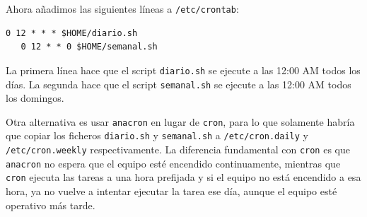 \documentclass[a4paper,10pt]{article}
\newenvironment{answer}{%
\begin{list}{}{%
}%
\item[]}{\end{list}}
\begin{document}
\begin{answer}
  Ahora añadimos las siguientes líneas a \texttt{/etc/crontab}:
  \begin{lstlisting}[style=BashInputStyle]
   0 12 * * * $HOME/diario.sh
   0 12 * * 0 $HOME/semanal.sh
  \end{lstlisting}
  
  La primera línea hace que el script \texttt{diario.sh} se ejecute a las 12:00 AM  todos los días.
  La segunda hace que el script \texttt{semanal.sh} se ejecute a las 12:00 AM todos los domingos.
  
  Otra alternativa es usar \texttt{anacron} en lugar de \texttt{cron}, para lo que solamente habría que copiar
  los ficheros \texttt{diario.sh} y \texttt{semanal.sh} a \texttt{/etc/cron.daily} y \texttt{/etc/cron.weekly} respectivamente.
  La diferencia fundamental con \texttt{cron} es que \texttt{anacron} no espera que el equipo esté encendido continuamente, mientras que
  \texttt{cron} ejecuta las tareas a una hora prefijada y si el equipo no está encendido a esa hora, ya no vuelve a intentar ejecutar la tarea
  ese día, aunque el equipo esté operativo más tarde.
  
  \cite{cron} \cite{anacron}
  \end{answer}
\end{document}
